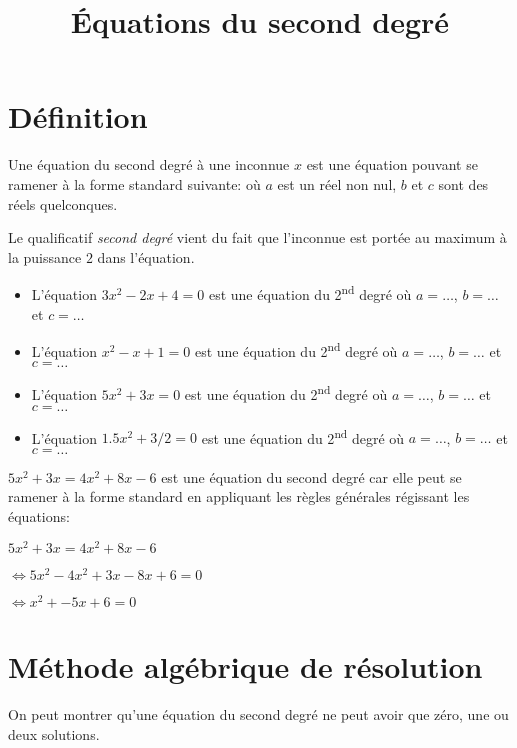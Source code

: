 \documentclass[a4paper,12pt]{scrartcl}
\date{}
\title{Équations du second degré}
\author{}
\begin{document}

\maketitle

\tableofcontents

\section{Définition}

Une équation du second degré à une inconnue $x$ est une équation pouvant se ramener à la forme standard suivante:  où $a$ est un réel non nul, $b$ et $c$ sont des réels quelconques.

Le qualificatif \emph{second degré} vient du fait que l'inconnue est portée au maximum à la puissance $2$ dans l'équation.

\exemple{}

\begin{itemize}
\item L'équation $3x^2 - 2x + 4 = 0$ est une équation du 2\textsuperscript{nd} degré où $a = \ldots$, $b = \ldots$ et $c = \ldots$ 
\item L'équation $x^2 - x + 1 = 0$ est une équation du 2\textsuperscript{nd} degré où $a = \ldots$, $b = \ldots$ et $c = \ldots$ 
\item L'équation $5x^2 +3x = 0$ est une équation du 2\textsuperscript{nd} degré où $a = \ldots$, $b = \ldots$ et $c = \ldots$ 
\item L'équation $1.5x^2 + 3/2 = 0$ est une équation du 2\textsuperscript{nd} degré où $a = \ldots$, $b = \ldots$ et $c = \ldots$ 
\end{itemize}

\exemple{}
$5x^2 + 3x = 4x^2 + 8x - 6$ est une équation du second degré car elle peut se
ramener à la forme standard en appliquant les règles générales régissant les équations:

$5x^2 + 3x = 4x^2 + 8x - 6$

$\Leftrightarrow 5x^2 - 4x^2 + 3x - 8x +6 = 0$

$\Leftrightarrow x^2 + - 5x +6 = 0$

\section{Méthode algébrique de résolution}\label{methode}

On peut montrer qu’une équation du second degré ne peut avoir que zéro, une ou deux solutions. 
\end{document}
